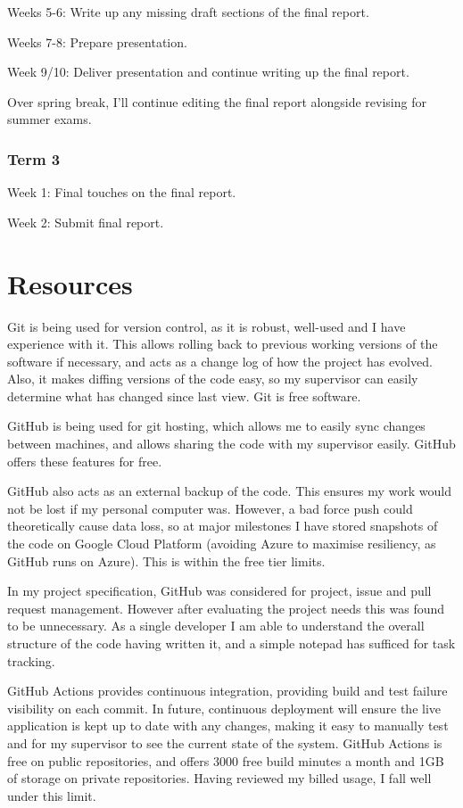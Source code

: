 \documentclass[a4paper,fleqn,12pt]{article}
\begin{document}
Weeks 5-6: Write up any missing draft sections of the final report.

Weeks 7-8: Prepare presentation.

Week 9/10: Deliver presentation and continue writing up the final report.

Over spring break, I’ll continue editing the final report alongside revising for summer exams.

\subsubsection{Term 3}\label{id:h.jbcgtsb8n2zo}

Week 1: Final touches on the final report.

Week 2: Submit final report.

\section{Resources}\label{id:h.8b8ghk7r824a}

Git is being used for version control, as it is robust, well-used and I have experience with it. This allows rolling back to previous working versions of the software if necessary, and acts as a change log of how the project has evolved. Also, it makes diffing versions of the code easy, so my supervisor can easily determine what has changed since last view. Git is free software.

GitHub is being used for git hosting, which allows me to easily sync changes between machines, and allows sharing the code with my supervisor easily. GitHub offers these features for free.

GitHub also acts as an external backup of the code. This ensures my work would not be lost if my personal computer was. However, a bad force push could theoretically cause data loss, so at major milestones I have stored snapshots of the code on Google Cloud Platform (avoiding Azure to maximise resiliency, as GitHub runs on Azure). This is within the free tier limits.

In my project specification, GitHub was considered for project, issue and pull request management. However after evaluating the project needs this was found to be unnecessary. As a single developer I am able to understand the overall structure of the code having written it, and a simple notepad has sufficed for task tracking.

GitHub Actions provides continuous integration, providing build and test failure visibility on each commit. In future, continuous deployment will ensure the live application is kept up to date with any changes, making it easy to manually test and for my supervisor to see the current state of the system. GitHub Actions is free on public repositories, and offers 3000 free build minutes a month and 1GB of storage on private repositories. Having reviewed my billed usage, I fall well under this limit.
\end{document}
